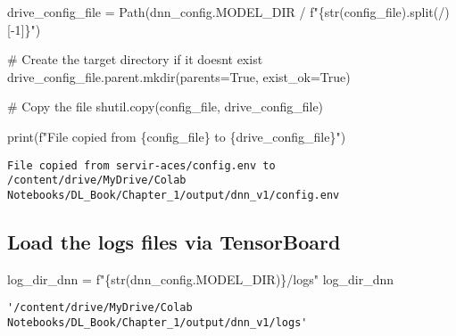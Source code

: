 \documentclass[
  letterpaper,
  DIV=11,
  numbers=noendperiod]{scrreprt}
\newenvironment{Shaded}{\begin{snugshade}}{\end{snugshade}}
\newcommand{\BuiltInTok}[1]{\textcolor[rgb]{0.00,0.23,0.31}{#1}}
\newcommand{\CommentTok}[1]{\textcolor[rgb]{0.37,0.37,0.37}{#1}}
\newcommand{\DecValTok}[1]{\textcolor[rgb]{0.68,0.00,0.00}{#1}}
\newcommand{\NormalTok}[1]{\textcolor[rgb]{0.00,0.23,0.31}{#1}}
\newcommand{\OperatorTok}[1]{\textcolor[rgb]{0.37,0.37,0.37}{#1}}
\newcommand{\SpecialCharTok}[1]{\textcolor[rgb]{0.37,0.37,0.37}{#1}}
\newcommand{\SpecialStringTok}[1]{\textcolor[rgb]{0.13,0.47,0.30}{#1}}
\newcommand{\StringTok}[1]{\textcolor[rgb]{0.13,0.47,0.30}{#1}}
\newcommand{\VariableTok}[1]{\textcolor[rgb]{0.07,0.07,0.07}{#1}}
\begin{document}
\begin{Shaded}
\begin{Highlighting}[]
\NormalTok{drive\_config\_file }\OperatorTok{=}\NormalTok{ Path(dnn\_config.MODEL\_DIR }\OperatorTok{/} \SpecialStringTok{f"}\SpecialCharTok{\{}\BuiltInTok{str}\NormalTok{(config\_file)}\SpecialCharTok{.}\NormalTok{split(}\StringTok{\textquotesingle{}/\textquotesingle{}}\NormalTok{)[}\OperatorTok{{-}}\DecValTok{1}\NormalTok{]}\SpecialCharTok{\}}\SpecialStringTok{"}\NormalTok{)}

\CommentTok{\# Create the target directory if it doesn\textquotesingle{}t exist}
\NormalTok{drive\_config\_file.parent.mkdir(parents}\OperatorTok{=}\VariableTok{True}\NormalTok{, exist\_ok}\OperatorTok{=}\VariableTok{True}\NormalTok{)}

\CommentTok{\# Copy the file}
\NormalTok{shutil.copy(config\_file, drive\_config\_file)}

\BuiltInTok{print}\NormalTok{(}\SpecialStringTok{f"File copied from }\SpecialCharTok{\{}\NormalTok{config\_file}\SpecialCharTok{\}}\SpecialStringTok{ to }\SpecialCharTok{\{}\NormalTok{drive\_config\_file}\SpecialCharTok{\}}\SpecialStringTok{"}\NormalTok{)}
\end{Highlighting}
\end{Shaded}

\begin{verbatim}
File copied from servir-aces/config.env to /content/drive/MyDrive/Colab Notebooks/DL_Book/Chapter_1/output/dnn_v1/config.env
\end{verbatim}

\subsection{Load the logs files via
TensorBoard}\label{load-the-logs-files-via-tensorboard-1}

\begin{Shaded}
\begin{Highlighting}[]
\NormalTok{log\_dir\_dnn }\OperatorTok{=} \SpecialStringTok{f"}\SpecialCharTok{\{}\BuiltInTok{str}\NormalTok{(dnn\_config.MODEL\_DIR)}\SpecialCharTok{\}}\SpecialStringTok{/logs"}
\NormalTok{log\_dir\_dnn}
\end{Highlighting}
\end{Shaded}

\begin{verbatim}
'/content/drive/MyDrive/Colab Notebooks/DL_Book/Chapter_1/output/dnn_v1/logs'
\end{verbatim}
\end{document}
